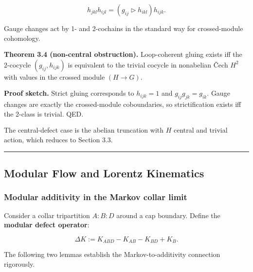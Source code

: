 \documentclass[11pt,a4paper]{article}
\theoremstyle{remark}
\begin{document}
\[
h_{jkl} h_{ijl} = (g_{ij} \triangleright h_{ikl}) h_{ijk}.
\]

Gauge changes act by 1- and 2-cochains in the standard way for crossed-module
cohomology.

\textbf{Theorem 3.4 (non-central obstruction).} Loop-coherent gluing exists iff
the 2-cocycle \((g_{ij}, h_{ijk})\) is equivalent to the trivial cocycle in
nonabelian \v{C}ech \(H^2\) with values in the crossed module \((H \to G)\).

\textbf{Proof sketch.} Strict gluing corresponds to \(h_{ijk}=1\) and \(g_{ij}g_{jk}=g_{ik}\).
Gauge changes are exactly the crossed-module coboundaries, so strictification
exists iff the 2-class is trivial. QED.

The central-defect case is the abelian truncation with \(H\) central and trivial
action, which reduces to Section 3.3.

\begin{center}\rule{0.5\linewidth}{0.5pt}\end{center}

\subsection{Modular Flow and Lorentz Kinematics}\label{modular-flow-and-lorentz-kinematics}

\subsubsection{Modular additivity in the Markov collar limit}\label{modular-additivity-in-the-markov-collar-limit}

Consider a collar tripartition \(A:B:D\) around a cap boundary. Define the
\textbf{modular defect operator}:

\[
\Delta K := K_{ABD} - K_{AB} - K_{BD} + K_B.
\]

The following two lemmas establish the Markov-to-additivity connection rigorously.
\end{document}
